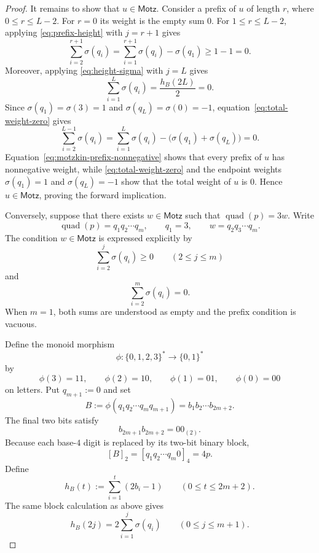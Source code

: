 \documentclass[12pt]{article}
\theoremstyle{plain}
\theoremstyle{definition}
\theoremstyle{plain}
\begin{document}
\begin{proof}
It remains to show that $u\in\mathsf{Motz}$.  Consider a prefix of $u$ of
length $r$, where $0\leq r\leq L-2$.  For $r=0$ its weight is the empty sum
$0$.  For $1\leq r\leq L-2$, applying \eqref{eq:prefix-height} with
$j=r+1$ gives
\begin{equation}\label{eq:motzkin-prefix-nonnegative}
 \sum_{i=2}^{r+1}\sigma(q_i)
 =\sum_{i=1}^{r+1}\sigma(q_i)-\sigma(q_1)
 \geq1-1=0.
\end{equation}
Moreover, applying \eqref{eq:height-sigma} with $j=L$ gives
\begin{equation}\label{eq:total-weight-zero}
 \sum_{i=1}^{L}\sigma(q_i)
 =\frac{h_B(2L)}{2}
 =0.
\end{equation}
Since $\sigma(q_1)=\sigma(3)=1$ and
$\sigma(q_L)=\sigma(0)=-1$, equation~\eqref{eq:total-weight-zero} gives
\[
 \sum_{i=2}^{L-1}\sigma(q_i)
 =\sum_{i=1}^{L}\sigma(q_i)
  -\bigl(\sigma(q_1)+\sigma(q_L)\bigr)
 =0.
\]
Equation~\eqref{eq:motzkin-prefix-nonnegative} shows that every prefix
of $u$ has nonnegative weight, while \eqref{eq:total-weight-zero} and the
endpoint weights $\sigma(q_1)=1$ and $\sigma(q_L)=-1$ show that the total
weight of $u$ is $0$.  Hence $u\in\mathsf{Motz}$, proving the forward
implication.

Conversely, suppose that there exists $w\in\mathsf{Motz}$ such that
$\operatorname{quad}(p)=3w$.  Write
\[
 \operatorname{quad}(p)=q_1q_2\cdots q_m,
 \qquad
 q_1=3,
 \qquad
 w=q_2q_3\cdots q_m.
\]
The condition $w\in\mathsf{Motz}$ is expressed explicitly by
\begin{equation}\label{eq:reverse-motzkin-prefix}
 \sum_{i=2}^{j}\sigma(q_i)\geq0
 \qquad(2\leq j\leq m)
\end{equation}
and
\begin{equation}\label{eq:reverse-motzkin-total}
 \sum_{i=2}^{m}\sigma(q_i)=0.
\end{equation}
When $m=1$, both sums are understood as empty and the prefix condition is
vacuous.

Define the monoid morphism
\[
 \phi:\{0,1,2,3\}^*\longrightarrow\{0,1\}^*
\]
by
\[
 \phi(3)=11,\qquad
 \phi(2)=10,\qquad
 \phi(1)=01,\qquad
 \phi(0)=00
\]
on letters.  Put $q_{m+1}:=0$ and set
\[
 B:=\phi(q_1q_2\cdots q_mq_{m+1})
   =b_1b_2\cdots b_{2m+2}.
\]
The final two bits satisfy
\[
 b_{2m+1}b_{2m+2}=00_{(2)}.
\]
Because each base-$4$ digit is replaced by its two-bit binary block,
\begin{equation}\label{eq:block-value}
 [B]_2=[q_1q_2\cdots q_m0]_4=4p.
\end{equation}
Define
\[
 h_B(t):=\sum_{i=1}^{t}(2b_i-1)
 \qquad(0\leq t\leq2m+2).
\]
The same block calculation as above gives
\begin{equation}\label{eq:reverse-height-sigma}
 h_B(2j)=2\sum_{i=1}^{j}\sigma(q_i)
 \qquad(0\leq j\leq m+1).
\end{equation}


\end{proof}
\end{document}
